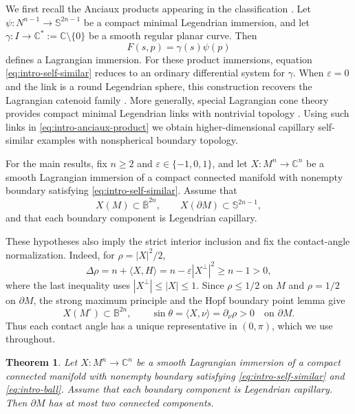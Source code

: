 \documentclass[11pt,a4paper]{article}
\numberwithin{equation}{section}
\newtheorem{theorem}{Theorem}[section]
\newcommand{\C}{\mathbb C}
\newcommand{\B}{\mathbb B}
\newcommand{\Sph}{\mathbb S}
\begin{document}
We first recall the Anciaux products appearing in the classification  \cite{Anciaux2006}. Let
$
        \psi:N^{n-1}\rightarrow\Sph^{2n-1}
$
be a compact minimal Legendrian immersion, and let
$\gamma:I\to\C^*:=\C\setminus\{0\}$ be a smooth regular planar curve.  Then
\begin{equation}\label{eq:intro-anciaux-product}
        F(s,p)=\gamma(s)\psi(p)
\end{equation}
defines a Lagrangian immersion.  For these product immersions, equation
\eqref{eq:intro-self-similar} reduces to an ordinary differential system
for $\gamma$.  When $\varepsilon=0$ and the link is a round Legendrian
sphere, this construction recovers the Lagrangian catenoid family
\cite{Anciaux2006,CastroUrbano1999,GaoMaYao2026,HarveyLawson1982}.  More generally, special Lagrangian cone theory provides compact minimal Legendrian links with nontrivial topology \cite{Haskins2004, HaskinsKapouleas2007}. Using such links in \eqref{eq:intro-anciaux-product} we obtain higher-dimensional capillary self-similar examples with nonspherical boundary topology.  

For the main results, fix $n\ge2$ and
$\varepsilon\in\{-1,0,1\}$, and let
$X:M^n\to\C^n$ be a smooth Lagrangian immersion of a compact connected
manifold with nonempty boundary satisfying
\eqref{eq:intro-self-similar}.  Assume that
\begin{equation}\label{eq:intro-ball}
        X(M)\subset\overline{\B}^{2n},
        \qquad
        X(\partial M)\subset\Sph^{2n-1},
\end{equation}
and that each boundary component is Legendrian capillary.

These hypotheses also imply the strict interior inclusion and fix the
contact-angle normalization.  Indeed, for $\rho=|X|^2/2$,
\[
        \Delta\rho
        =n+\langle X,H\rangle
        =n-\varepsilon|X^\perp|^2
        \ge n-1>0,
\]
where the last inequality uses $|X^\perp|\le |X|\le1$.  Since
$\rho\le1/2$ on $M$ and $\rho=1/2$ on $\partial M$, the strong maximum
principle and the Hopf boundary point lemma give
\[
        X(M^\circ)\subset\B^{2n},
        \qquad
        \sin\theta
        =\langle X,\nu\rangle
        =\partial_\nu\rho>0
        \quad\text{on }\partial M.
\]
Thus each contact angle has a unique representative in $(0,\pi)$, which
we use throughout. 

\begin{theorem}\label{thm:boundary-components}
Let
$X:M^n\to\C^n$ be a smooth Lagrangian immersion of a compact connected
manifold with nonempty boundary satisfying
\eqref{eq:intro-self-similar} and \eqref{eq:intro-ball}.
Assume that each boundary component is Legendrian capillary. Then \(\partial M\) has at most two connected components.
\end{theorem}
\end{document}

